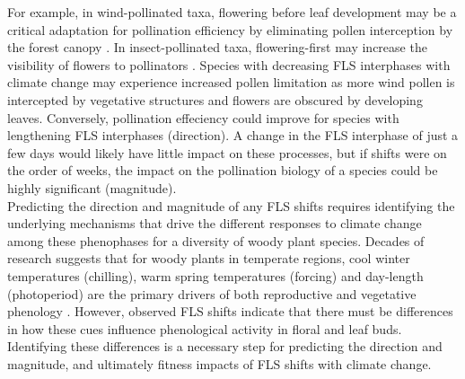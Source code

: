 \documentclass[11pt]{article}
\begin{document}
For example, in wind-pollinated taxa, flowering before leaf development may be a critical adaptation for pollination efficiency by eliminating pollen interception by the forest canopy \citep{Whitehead1969}. In insect-pollinated taxa, flowering-first may increase the visibility of flowers to pollinators \citep{Janzen1967,Savage2019}. Species with decreasing FLS interphases with climate change may experience increased pollen limitation as more wind pollen is intercepted by vegetative structures and flowers are obscured by developing leaves. Conversely, pollination effeciency could improve for species with lengthening FLS interphases (direction). A change in the FLS interphase of just a few days would likely have little impact on these processes, but if shifts were on the order of weeks, the impact on the pollination biology of a species could be highly significant (magnitude).\\

Predicting the direction and magnitude of any FLS shifts requires identifying the underlying mechanisms that drive the different responses to climate change among these phenophases for a diversity of woody plant species. %
Decades of research suggests that for woody plants in temperate regions, cool winter temperatures (chilling), warm spring temperatures (forcing) and day-length (photoperiod) are the primary drivers of both reproductive and vegetative phenology \citep{Forrest2018,Flynn2018}. However, observed FLS shifts indicate that there must be differences in how these cues influence phenological activity in floral and leaf buds. %
Identifying these differences is a necessary step for predicting the direction and magnitude, and ultimately fitness impacts of FLS shifts with climate change.\\
 
\end{document}
